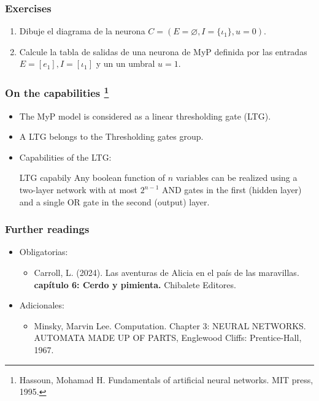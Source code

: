 \documentclass[aspectratio=169]{beamer}
\begin{document}
\begin{frame}
\frametitle{Exercises}
\begin{enumerate}
\item Dibuje el diagrama de la neurona $C=(E=\varnothing, I=\{\iota_1 \}, u = 0)$.
\item Calcule la tabla de salidas de una neurona de MyP definida por las entradas $E=[e_1], I = [\iota_1]$ y un un umbral $u = 1$.
\end{enumerate}
\end{frame}

\begin{frame}
\frametitle{On the capabilities \footnote{Hassoun, Mohamad H. Fundamentals of artificial neural networks. MIT press, 1995.}}
\begin{itemize}
\item The MyP model is considered as a linear thresholding gate (LTG).
\item A LTG belongs to the Thresholding gates group.
\item Capabilities of the LTG:
\begin{block}{LTG capabily}
Any boolean function of $n$ variables can be realized using a two-layer network with at most $2^{n-1}$ AND gates in the first (hidden layer) and a single OR gate in the second (output) layer.
\end{block}
\end{itemize}
\end{frame}


\begin{frame}
\frametitle{Further readings}
\begin{itemize}
	\item Obligatorias:
	\begin{itemize}
		\item Carroll, L. (2024). Las aventuras de Alicia en el país de las maravillas. \textbf{capítulo 6: Cerdo y pimienta.} Chibalete Editores.	
	\end{itemize}
\item Adicionales:
	\begin{itemize}
		\item Minsky, Marvin Lee. Computation. Chapter 3: NEURAL NETWORKS. AUTOMATA MADE UP OF PARTS, Englewood Cliffs: Prentice-Hall, 1967.
	\end{itemize} 
\end{itemize}
\end{frame}


\end{document}
